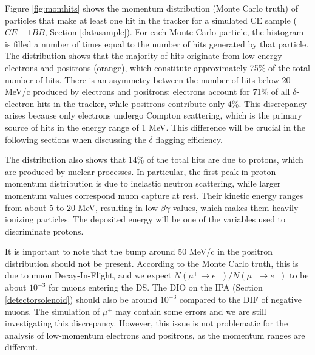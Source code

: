 Figure \ref{fig:momhits} shows the 
momentum distribution (Monte Carlo truth) of 
particles that make at least one hit in the 
tracker for a simulated CE sample ($CE-1BB$, 
Section \ref{datasample}). 
For each Monte Carlo particle, the 
histogram is filled a number of times 
equal to the number of hits generated 
by that particle.
The distribution shows that the 
majority of hits originate from 
low-energy electrons and positrons 
(orange), which constitute approximately 
75\% of the total number of hits. 
There is an asymmetry between the 
number of hits below 20 MeV/c 
produced by electrons and positrons: 
electrons account for 
71\% of all $\delta$-electron hits in 
the tracker, while positrons 
contribute only 4\%. This discrepancy 
arises because only electrons 
undergo Compton scattering, which is 
the primary source of hits in the energy 
range of 1 MeV. This difference 
will be crucial in 
the following sections when discussing 
the $\delta$ flagging efficiency.

The distribution also shows that 14\% of 
the total hits are due to protons, 
which are produced by nuclear processes. 
In particular, the first peak in proton  
momentum distribution is due to  
inelastic neutron scattering, while 
larger momentum values correspond muon 
capture at rest.
Their kinetic energy ranges from about 
5 to 20 MeV, resulting in low $\beta \gamma$ values, 
which makes them heavily ionizing particles. 
The deposited energy will be 
one of the variables used to discriminate protons. 

It is important to note that the bump 
around 50 MeV/c in 
the positron distribution should not be 
present. According 
to the Monte Carlo truth, this is due to 
muon Decay-In-Flight, 
and we expect 
$N(\mu^+ \rightarrow e^+ )/N(\mu^- \rightarrow e^- )$ 
to be about $10^{-3}$ 
for muons entering the DS. The DIO on the IPA 
(Section \ref{detectorsolenoid}) 
should also be around 
$10^{-3}$ compared to the DIF of 
negative muons. 
The simulation of $\mu^+$ may 
contain some errors and we are still 
investigating this discrepancy. 
However, this issue is not problematic for the analysis 
of low-momentum electrons and positrons, 
as the momentum ranges are different.

